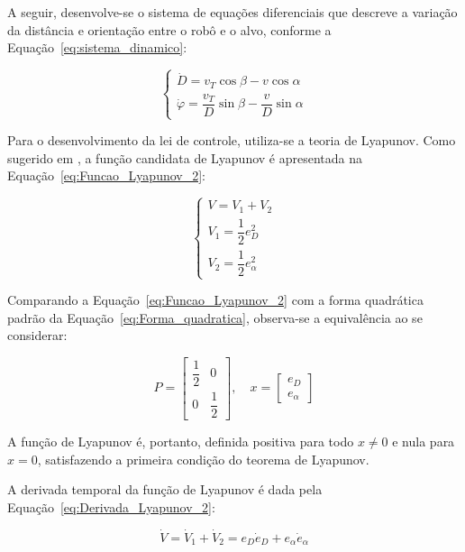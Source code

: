 \documentclass[conference]{IEEEtran}
\begin{document}
A seguir, desenvolve-se o sistema de equações diferenciais que descreve a variação da distância e orientação entre o robô e o alvo, conforme a Equação~\ref{eq:sistema_dinamico}:

\begin{equation}
    \begin{cases}
        \dot{D} = v_T\cos\beta - v\cos\alpha\\
        \dot{\varphi} = \dfrac{v_T}{D}\sin\beta - \dfrac{v}{D}\sin\alpha
    \end{cases}
    \label{eq:sistema_dinamico}
\end{equation}

Para o desenvolvimento da lei de controle, utiliza-se a teoria de Lyapunov. Como sugerido em \cite{b2}, a função candidata de Lyapunov é apresentada na Equação~\ref{eq:Funcao_Lyapunov_2}:

\begin{equation}
    \begin{cases}
        V = V_1 + V_2\\
        V_1 = \dfrac{1}{2}e_D^2\\
        V_2 = \dfrac{1}{2}e_\alpha^2
    \end{cases}
    \label{eq:Funcao_Lyapunov_2}
\end{equation}

Comparando a Equação~\ref{eq:Funcao_Lyapunov_2} com a forma quadrática padrão da Equação~\ref{eq:Forma_quadratica}, observa-se a equivalência ao se considerar:

\begin{equation}
    P =
    \begin{bmatrix}
       \dfrac{1}{2} & 0 \\
       0 & \dfrac{1}{2}
    \end{bmatrix},
    \quad
    x = 
    \begin{bmatrix}
        e_D \\
        e_\alpha
    \end{bmatrix}
    \label{eq:Forma_quadratica_2}
\end{equation}

A função de Lyapunov é, portanto, definida positiva para todo $x \neq 0$ e nula para $x = 0$, satisfazendo a primeira condição do teorema de Lyapunov.

A derivada temporal da função de Lyapunov é dada pela Equação~\ref{eq:Derivada_Lyapunov_2}:

\begin{equation}
    \dot{V} = \dot{V}_1 + \dot{V}_2 = e_D\dot{e}_D + e_\alpha\dot{e}_\alpha
    \label{eq:Derivada_Lyapunov_2}
\end{equation}
\end{document}
